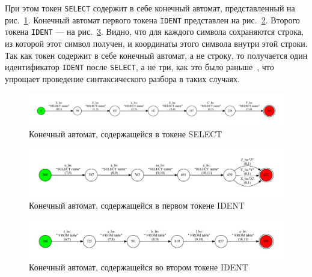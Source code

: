 \documentclass{matmex-diploma}
\begin{document}
При этом токен \verb|SELECT| содержит в себе конечный автомат, представленный на рис.~\ref{fig:tsql_select}. Конечный автомат первого токена \verb|IDENT| представлен на рис.~\ref{fig:tsql_ident_1}. Второго токена \verb|IDENT| --- на рис.~\ref{fig:tsql_ident_2}. Видно, что для каждого символа сохраняются строка, из которой этот символ получен, и координаты этого символа внутри этой строки. Так как токен содержит в себе конечный автомат, а не строку, то получается один идентификатор \verb|IDENT| после \verb|SELECT|, а не три, как это было раньше~\cite{Verbitskaya, Polubelova}, что упрощает проведение синтаксического разбора в таких случаях.  

\begin{figure}[H]
\begin{center}
\includegraphics[width=1.0\textwidth]{tsql_select}
\caption{Конечный автомат, содержащейся в токене SELECT}
\label{fig:tsql_select} 
\end{center}
\end{figure}

\begin{figure}[H]
\begin{center}
\includegraphics[width=1.0\textwidth]{tsql_ident_1}
\caption{Конечный автомат, содержащейся в первом токене IDENT}
\label{fig:tsql_ident_1} 
\end{center}
\end{figure}

\begin{figure}[H]
\begin{center}
\includegraphics[width=1.0\textwidth]{tsql_ident_2}
\caption{Конечный автомат, содержащейся во втором токене IDENT}
\label{fig:tsql_ident_2} 
\end{center}
\end{figure}
\end{document}
